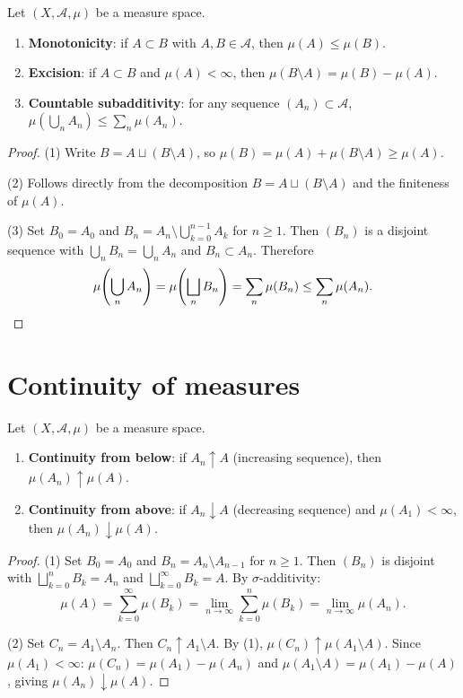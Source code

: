 \begin{proposition}
\label{prop:monotonicity}
Let $(X, \mathcal{A}, \mu)$ be a measure space.
\begin{enumerate}
    \item \textbf{Monotonicity}: if $A \subset B$ with $A, B \in \mathcal{A}$, then
    $\mu(A) \leq \mu(B)$.
    \item \textbf{Excision}: if $A \subset B$ and $\mu(A) < \infty$, then
    $\mu(B \setminus A) = \mu(B) - \mu(A)$.
    \item \textbf{Countable subadditivity}: for any sequence
    $(A_n) \subset \mathcal{A}$,
    $\mu\!\left(\bigcup_n A_n\right) \leq \sum_n \mu(A_n)$.
\end{enumerate}
\end{proposition}

\begin{proof}
(1) Write $B = A \sqcup (B \setminus A)$, so
$\mu(B) = \mu(A) + \mu(B \setminus A) \geq \mu(A)$.

(2) Follows directly from the decomposition $B = A \sqcup (B \setminus A)$ and
the finiteness of $\mu(A)$.

(3) Set $B_0 = A_0$ and $B_n = A_n \setminus \bigcup_{k=0}^{n-1} A_k$ for
$n \geq 1$. Then $(B_n)$ is a disjoint sequence with $\bigcup_n B_n =
\bigcup_n A_n$ and $B_n \subset A_n$. Therefore
\[
\mu\!\left(\bigcup_n A_n\right) = \mu\!\left(\bigsqcup_n B_n\right)
= \sum_n \mu(B_n) \leq \sum_n \mu(A_n). \qedhere
\]
\end{proof}

\section{Continuity of measures}

\begin{theorem}
\label{thm:monotone_continuity}
Let $(X, \mathcal{A}, \mu)$ be a measure space.
\begin{enumerate}
    \item \textbf{Continuity from below}: if $A_n \uparrow A$ (increasing sequence),
    then $\mu(A_n) \uparrow \mu(A)$.
    \item \textbf{Continuity from above}: if $A_n \downarrow A$ (decreasing sequence)
    and $\mu(A_1) < \infty$, then $\mu(A_n) \downarrow \mu(A)$.
\end{enumerate}
\end{theorem}

\begin{proof}
(1) Set $B_0 = A_0$ and $B_n = A_n \setminus A_{n-1}$ for $n \geq 1$. Then
$(B_n)$ is disjoint with $\bigsqcup_{k=0}^n B_k = A_n$ and
$\bigsqcup_{k=0}^\infty B_k = A$. By $\sigma$-additivity:
\[
\mu(A) = \sum_{k=0}^{\infty} \mu(B_k) = \lim_{n \to \infty} \sum_{k=0}^n \mu(B_k)
= \lim_{n \to \infty} \mu(A_n).
\]

(2) Set $C_n = A_1 \setminus A_n$. Then $C_n \uparrow A_1 \setminus A$. By (1),
$\mu(C_n) \uparrow \mu(A_1 \setminus A)$. Since $\mu(A_1) < \infty$:
$\mu(C_n) = \mu(A_1) - \mu(A_n)$ and $\mu(A_1 \setminus A) = \mu(A_1) - \mu(A)$,
giving $\mu(A_n) \downarrow \mu(A)$.
\end{proof}

